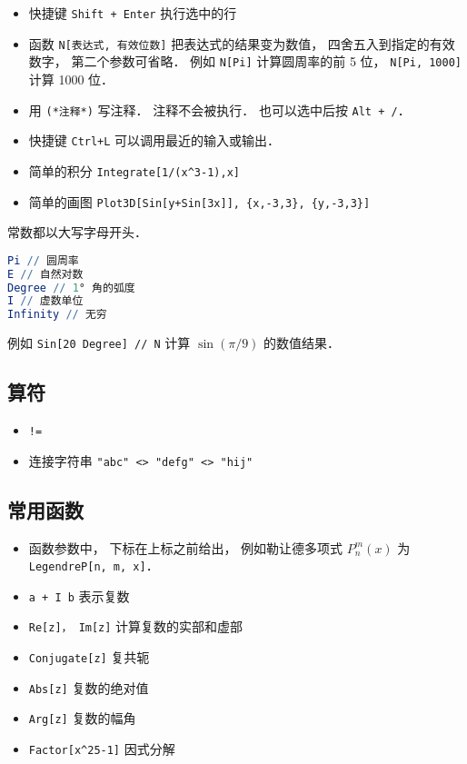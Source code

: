 
\begin{issues}
\issueDraft
\end{issues}


\begin{itemize}
\item 快捷键 \verb|Shift + Enter| 执行选中的行
\item 函数 \verb|N[表达式, 有效位数]| 把表达式的结果变为数值， 四舍五入到指定的有效数字， 第二个参数可省略． 例如 \verb|N[Pi]| 计算圆周率的前 5 位， \verb|N[Pi, 1000]| 计算 1000 位．
\item 用 \verb|(*注释*)| 写注释． 注释不会被执行． 也可以选中后按 \verb|Alt + /|．
\item 快捷键 \verb|Ctrl+L| 可以调用最近的输入或输出．
\item 简单的积分 \verb|Integrate[1/(x^3-1),x]|
\item 简单的画图 \verb|Plot3D[Sin[y+Sin[3x]], {x,-3,3}, {y,-3,3}]|
\end{itemize}

常数都以大写字母开头．
\begin{lstlisting}[language=Mathematica]
Pi // 圆周率
E // 自然对数
Degree // 1° 角的弧度
I // 虚数单位
Infinity // 无穷
\end{lstlisting}
例如 \verb|Sin[20 Degree] // N| 计算 $\sin(\pi/9)$ 的数值结果．


\subsection{算符}
\begin{itemize}
\item \verb|!=|
\item 连接字符串 \verb|"abc" <> "defg" <> "hij"|
\end{itemize}

\subsection{常用函数}
\begin{itemize}
\item 函数参数中， 下标在上标之前给出， 例如勒让德多项式 $P_n^m(x)$ 为 \verb|LegendreP[n, m, x]|．
\item \verb|a + I b| 表示复数
\item \verb|Re[z]， Im[z]| 计算复数的实部和虚部
\item \verb|Conjugate[z]| 复共轭
\item \verb|Abs[z]| 复数的绝对值
\item \verb|Arg[z]| 复数的幅角
\item \verb|Factor[x^25-1]| 因式分解
\end{itemize}

